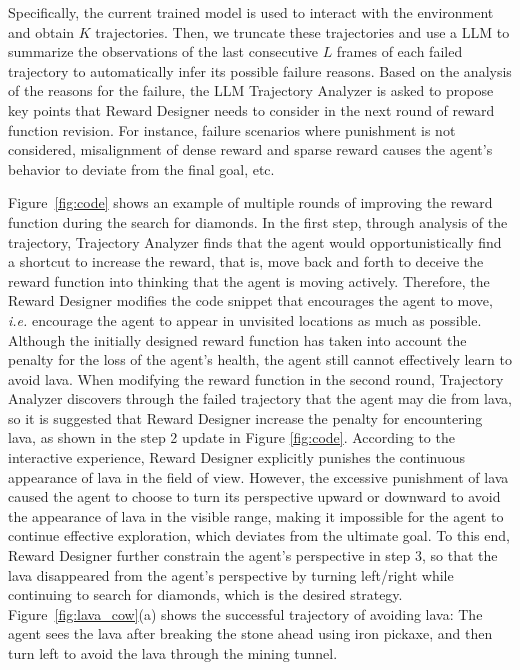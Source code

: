 Specifically, the current trained model is used to interact with the environment and obtain $K$ trajectories.
Then, we truncate these trajectories and use a LLM to summarize the observations of the last consecutive $L$ frames of each failed trajectory to automatically infer its possible failure reasons. Based on the analysis of the reasons for the failure, the LLM Trajectory Analyzer is asked to propose key points that Reward Designer needs to consider in the next round of reward function revision. For instance, failure scenarios where punishment is not considered, misalignment of dense reward and sparse reward causes the agent's behavior to deviate from the final goal, etc.



Figure~\ref{fig:code} shows an example of multiple rounds of improving the reward function during the search for diamonds. In the first step, through analysis of the trajectory, Trajectory Analyzer finds that the agent would opportunistically find a shortcut to increase the reward, that is, move back and forth to deceive the reward function into thinking that the agent is moving actively. Therefore, the Reward Designer modifies the code snippet that encourages the agent to move, \emph{i.e.} encourage the agent to appear in unvisited locations as much as possible. Although the initially designed reward function has taken into account the penalty for the loss of the agent's health, the agent still cannot effectively learn to avoid lava.
When modifying the reward function in the second round, Trajectory Analyzer discovers through the failed trajectory that the agent may die from lava, so it is suggested that Reward Designer increase the penalty for encountering lava, as shown in the step 2 update in Figure \ref{fig:code}.
According to the interactive experience, Reward Designer explicitly punishes the continuous appearance of lava in the field of view. However, the excessive punishment of lava caused the agent to choose to turn its perspective upward or downward to avoid the appearance of lava in the visible range, making it impossible for the agent to continue effective exploration, which deviates from the ultimate goal. To this end, Reward Designer further constrain the agent's perspective in step 3, so that the lava disappeared from the agent's perspective by turning left/right while continuing to search for diamonds, which is the desired strategy. Figure~\ref{fig:lava_cow}(a) shows the successful trajectory of avoiding lava: 
The agent sees the lava after breaking the stone ahead using iron pickaxe, and then turn left to avoid the lava through the mining tunnel.


